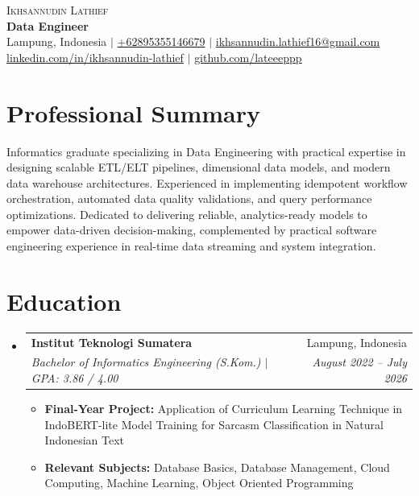 \documentclass[letterpaper,10pt]{article}
\makeatletter
\newcommand{\resumeItem}[1]{
  \item\small{
    {#1 \vspace{-2pt}}
  }
}
\newcommand{\resumeSubheading}[4]{
  \vspace{-2pt}\item
    \begin{tabular*}{\textwidth}[t]{l@{\extracolsep{\fill}}r}
      \textbf{#1} & \small #2 \\
      \textit{\small#3} & \textit{\small #4} \\
    \end{tabular*}\vspace{-5pt}
}
\newcommand{\resumeItemListStart}{\begin{itemize}[leftmargin=0.15in, label=\vphantom{X}\tiny$\bullet$]}
\newcommand{\resumeItemListEnd}{\end{itemize}\vspace{-4pt}}
\newcommand{\resumeSubHeadingListStart}{\begin{itemize}[leftmargin=0.0in, label={}]}
\newcommand{\resumeSubHeadingListEnd}{\end{itemize}}
\makeatother
\begin{document}
\begin{center}
    {\Huge \scshape Ikhsannudin Lathief} \\ \vspace{2pt}
    {\large \textbf{Data Engineer}} \\ \vspace{3pt}
    \small
    Lampung, Indonesia $|$
    \href{tel:+62895355146679}{+62895355146679} $|$
    \href{mailto:ikhsannudin.lathief16@gmail.com}{ikhsannudin.lathief16@gmail.com} \\ \vspace{3pt}
    \href{https://www.linkedin.com/in/ikhsannudin-lathief/}{linkedin.com/in/ikhsannudin-lathief} $|$
    \href{https://github.com/lateeeppp}{github.com/lateeeppp}
\end{center}

\section{Professional Summary}
\small{
Informatics graduate specializing in Data Engineering with practical expertise in designing scalable ETL/ELT pipelines, dimensional data models, and modern data warehouse architectures. Experienced in implementing idempotent workflow orchestration, automated data quality validations, and query performance optimizations. Dedicated to delivering reliable, analytics-ready models to empower data-driven decision-making, complemented by practical software engineering experience in real-time data streaming and system integration.
}
\vspace{-2pt}

\section{Education}
\resumeSubHeadingListStart
  \resumeSubheading
    {Institut Teknologi Sumatera}{Lampung, Indonesia}
    {Bachelor of Informatics Engineering (S.Kom.) $|$ GPA: 3.86 / 4.00}{August 2022 -- July 2026}
    \vspace{0pt}
    \resumeItemListStart
      \resumeItem{\textbf{Final-Year Project:} Application of Curriculum Learning Technique in IndoBERT-lite Model Training for Sarcasm Classification in Natural Indonesian Text}
      \vspace{0.5pt}
      \resumeItem{\textbf{Relevant Subjects:} Database Basics, Database Management, Cloud Computing, Machine Learning, Object Oriented Programming}
    \resumeItemListEnd
\resumeSubHeadingListEnd
\end{document}

